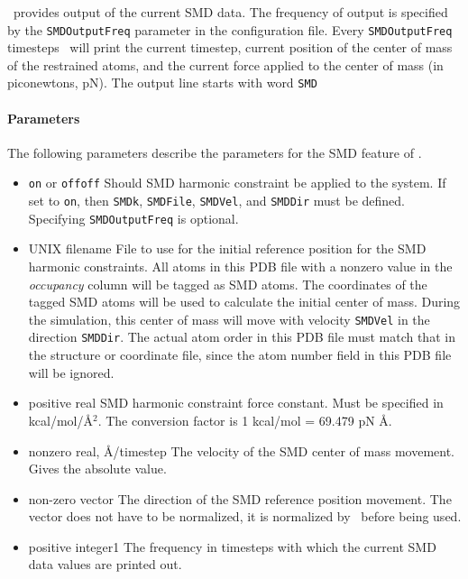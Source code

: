 \NAMD\ provides output of the current SMD data. The frequency of
output is specified by the {\tt SMDOutputFreq} parameter in the
configuration file. Every {\tt SMDOutputFreq} timesteps \NAMD\ will
print the current timestep, current position of the center of mass of the
restrained atoms, and
the current force applied to the center of mass (in piconewtons, pN).
The output line starts with word {\tt SMD}

\paragraph*{Parameters}

The following parameters describe the parameters for the 
SMD feature of \NAMD.
\begin{itemize}
\item 
{}
{{\tt on} or {\tt off}}{{\tt off}}
{Should SMD harmonic constraint be applied to the system. If set 
to {\tt on}, then  {\tt SMDk}, {\tt SMDFile}, {\tt SMDVel}, and
{\tt SMDDir} must be defined.  Specifying {\tt SMDOutputFreq} 
is optional.}

\item
{}
{UNIX filename} {File to use for the initial reference position for the SMD
harmonic constraints.  All atoms in this PDB file with a nonzero value in the
{\em occupancy} column will be tagged as SMD atoms.  The coordinates of the
tagged SMD atoms will be used to calculate the initial center of mass.
During the simulation, this center of mass will move with velocity
{\tt SMDVel} in the direction {\tt SMDDir}. The actual atom order in this PDB
file must match that in the structure or coordinate file, since the atom
number field in this PDB file will be ignored.}

\item
{}
{positive real}
{SMD harmonic constraint force constant. Must be specified in
kcal/mol/\AA$^2$. The conversion factor is 1 kcal/mol = 69.479 pN \AA.} 

\item
{}
{nonzero real, \AA/timestep}
{The velocity of the SMD center of mass movement. Gives the absolute
value.}

\item
{}
{non-zero vector}
{The direction of the SMD reference position movement. The vector does
not have to be normalized, it is normalized by \NAMD\ before being used.}

\item
{}
{positive integer}{1} {The frequency in timesteps with which the
current SMD data values are printed out.}
\end{itemize}


